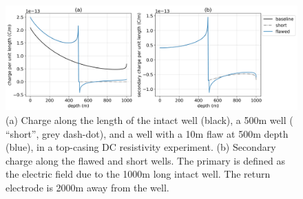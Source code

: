 \begin{figure}
    \begin{center}
    \includegraphics[width=\textwidth]{figures/casing_charge.png}
    \end{center}
\caption{
    (a) Charge along the length of the intact well (black),
    a 500m well ( ``short'', grey dash-dot), and
    a well with a 10m flaw at 500m depth (blue),
    in a top-casing DC resistivity experiment.
    (b) Secondary charge along the flawed and short wells. The primary is
    defined as the electric field due to the 1000m long intact well. The return electrode
    is 2000m away from the well.
}
\label{fig:casing_charge}
\end{figure}

